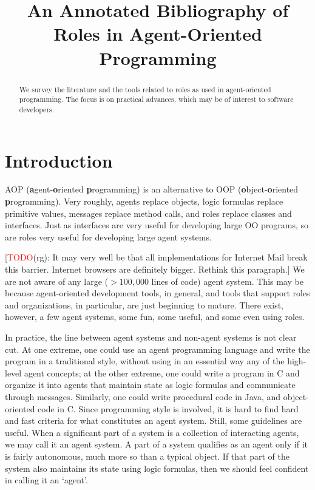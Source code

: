 \documentclass{article}
\title{An Annotated Bibliography of Roles in Agent-Oriented Programming}
\newcommand{\fb}[1]{\textbf{#1}}
\newcommand{\rg}[1]{{\small[\textcolor{red}{TODO}(rg): #1]}}
\begin{document}
\maketitle

\begin{abstract}
We survey the literature and the tools related to roles as used in agent-oriented programming.
The focus is on practical advances, which may be of interest to software developers.
\end{abstract}


\section{Introduction}\label{sec:introduction} %

AOP (\fb agent-\fb oriented \fb programming) is an alternative to OOP (\fb object-\fb oriented \fb programming).
Very roughly, agents replace objects, logic formulas replace primitive values, messages replace method calls, and roles replace classes and interfaces.
Just as interfaces are very useful for developing large OO programs, so are roles very useful for developing large agent systems.

\rg{It may very well be that all implementations for Internet Mail break this barrier. Internet browsers are definitely bigger. Rethink this paragraph.}
We are not aware of any large ($>100{,}000$ lines of code) agent system.
This may be because agent-oriented development tools, in general, and tools that support roles and organizations, in particular, are just beginning to mature.
There exist, however, a few agent systems, some fun, some useful, and some even using roles.

In practice, the line between agent systems and non-agent systems is not clear cut.
At one extreme, one could use an agent programming language and write the program in a traditional style, without using in an essential way any of the high-level agent concepts; at the other extreme, one could write a program in C and organize it into agents that maintain state as logic formulas and communicate through messages.
Similarly, one could write procedural code in Java, and object-oriented code in C\null.
Since programming style is involved, it is hard to find hard and fast criteria for what constitutes an agent system.
Still, some guidelines are useful.
When a significant part of a system is a collection of interacting agents, we may call it an agent system.
A part of a system qualifies as an agent only if it is fairly autonomous, much more so than a typical object.
If that part of the system also maintains its state using logic formulas, then we should feel confident in calling it an `agent'.
\end{document}
